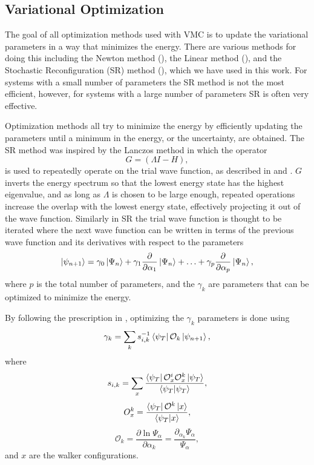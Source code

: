 \subsection{Variational Optimization}
The goal of all optimization methods used with VMC is to update the variational parameters in a way that minimizes the energy. There are various methods for doing this including the Newton method (\cite{casalegno2003,umrigar2005}), the Linear method (\cite{toulouse2007}), and the Stochastic Reconfiguration (SR) method (\cite{casula2004,sorella2001,sorella2005}), which we have used in this work. For systems with a small number of parameters the SR method is not the most efficient, however, for systems with a large number of parameters SR is often very effective.

Optimization methods all try to minimize the energy by efficiently updating the parameters until a minimum in the energy, or the uncertainty, are obtained. The SR method was inspired by the Lanczos method in which the operator
\begin{equation}
   G = \left(\Lambda I - H\right),
\end{equation}
is used to repeatedly operate on the trial wave function, as described in \cite{heeb1994} and \cite{sorella2001}. $G$ inverts the energy spectrum so that the lowest energy state has the highest eigenvalue, and as long as $\Lambda$ is chosen to be large enough, repeated operations increase the overlap with the lowest energy state, effectively projecting it out of the wave function. Similarly in SR the trial wave function is thought to be iterated where the next wave function can be written in terms of the previous wave function and its derivatives with respect to the parameters
\begin{equation}
   \left| \psi_{n+1} \right> = \gamma_0\left| \Psi_n \right> + \gamma_1\frac{\partial}{\partial \alpha_1}\left| \Psi_n \right> + \ldots + \gamma_p\frac{\partial}{\partial \alpha_p}\left| \Psi_n \right>,
   \label{equ:SRapproxgamma}
\end{equation}
where $p$ is the total number of parameters, and the $\gamma_k$ are parameters that can be optimized to minimize the energy.

By following the prescription in \cite{sorella2001}, optimizing the $\gamma_k$ parameters is done using
\begin{equation}
   \gamma_k = \sum\limits_k s^{-1}_{i,k} \left< \psi_T \right|\mathcal{O}_k\left| \psi_{n+1} \right>,
\end{equation}
where
\begin{equation}
   s_{i,k} = \sum\limits_x \frac{\left< \psi_T \right|\mathcal{O}^i_x\mathcal{O}^k_x\left| \psi_T \right>}{\left< \psi_T | \psi_T \right>},
\end{equation}
\begin{equation}
   O^k_x = \frac{\left< \psi_T \right|\mathcal{O}^k\left| x \right>}{\left< \psi_T | x \right>},
\end{equation}
\begin{equation}
   \mathcal{O}_k = \frac{\partial \ln \Psi_\alpha}{\partial \alpha_k} = \frac{\partial_{\alpha_k} \Psi_\alpha}{\Psi_\alpha},
\end{equation}
and $x$ are the walker configurations.

